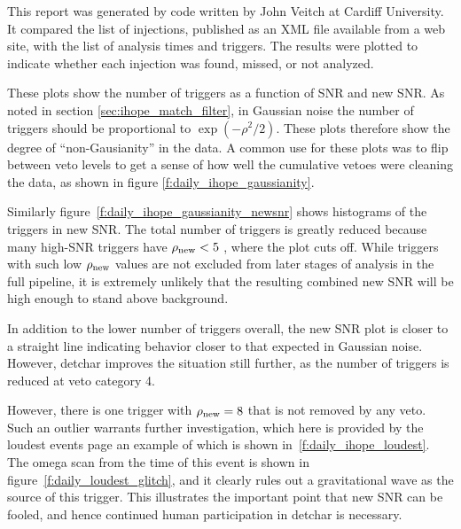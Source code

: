 
This report was generated by code written by John Veitch  at Cardiff
University.  It compared the list of injections, published as an XML
file available from a web site, with the list of analysis times and
triggers.  The results were plotted to indicate whether each injection
was found, missed, or not analyzed.



These plots show the number of triggers as a function of SNR and new
SNR.  As noted in section \ref{sec:ihope_match_filter}, in Gaussian
noise the number of triggers should be proportional to
$\exp(-\rho^2/2)$.  These plots therefore show the degree of
``non-Gausianity'' in the data.  A common use for these plots was to
flip between veto levels to get a sense of how well the cumulative
vetoes were cleaning the data, as shown in figure
\ref{f:daily_ihope_gaussianity}.

Similarly figure~\ref{f:daily_ihope_gaussianity_newsnr} shows histograms
of the triggers in new SNR.  The total number of triggers is greatly
reduced because many high-SNR triggers have $\rho_{\textrm{new}} < 5$ , where the
plot cuts off.  While triggers with such low $\rho_{\textrm{new}}$ values are not
excluded from later stages of analysis in the full pipeline, it is
extremely unlikely that the resulting combined new SNR will be high
enough to stand above background.

In addition to the lower number of triggers overall, the new SNR plot
is closer to a straight line indicating behavior closer to that
expected in Gaussian noise.  However, detchar improves the situation
still further, as the number of triggers is reduced at veto category
4.

However, there is one trigger with $\rho_{\textrm{new}} = 8$ that is not removed
by any veto.  Such an outlier warrants further investigation, which
here is provided by the loudest events page an example of which is
shown in~\ref{f:daily_ihope_loudest}.  The omega scan from the time of
this event is shown in figure~\ref{f:daily_loudest_glitch}, and it
clearly rules out a gravitational wave as the source of this trigger.
This illustrates the important point that new SNR can be fooled, and
hence continued human participation in detchar is necessary.

